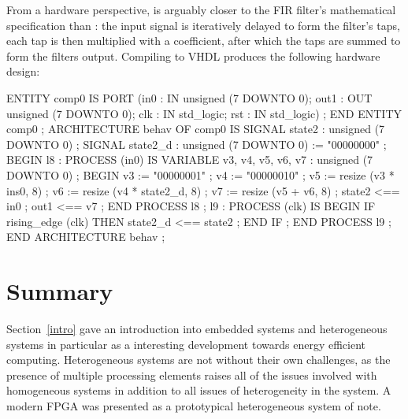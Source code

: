 \documentclass[../paper.tex]{subfiles}
\begin{document}
From a hardware perspective,  is arguably closer to the FIR filter's mathematical specification than : the input signal is iteratively delayed to form the filter's taps, each tap is then multiplied with a coefficient, after which the taps are summed to form the filters output. Compiling  to VHDL produces the following hardware design:

\begin{code}
ENTITY comp0 IS
  PORT (in0 : IN unsigned (7 DOWNTO 0);
        out1 : OUT unsigned (7 DOWNTO 0);
        clk : IN std_logic;
        rst : IN std_logic) ;
END ENTITY comp0 ;
ARCHITECTURE behav OF comp0 IS
  SIGNAL state2 : unsigned (7 DOWNTO 0) ;
  SIGNAL state2_d : unsigned (7 DOWNTO 0) := "00000000" ;
BEGIN
  l8 :
    PROCESS (in0) IS
      VARIABLE v3, v4, v5, v6, v7 : unsigned (7 DOWNTO 0) ; 
    BEGIN
      v3 := "00000001" ;
      v4 := "00000010" ;
      v5 := resize (v3 * ins0, 8) ;
      v6 := resize (v4 * state2_d, 8) ;
      v7 := resize (v5 + v6, 8) ;
      state2 <== in0 ;
      out1 <== v7 ;
    END PROCESS l8 ;
  l9 :
    PROCESS (clk) IS
    BEGIN
      IF rising_edge (clk) THEN
        state2_d <== state2 ;
      END IF ;
    END PROCESS l9 ;
END ARCHITECTURE behav ;
\end{code}

\section{Summary}

Section~\ref{intro} gave an introduction into embedded systems and heterogeneous systems in particular as a interesting development towards energy efficient computing. Heterogeneous systems are not without their own challenges, as the presence of multiple processing elements raises all of the issues involved with homogeneous systems in addition to all issues of heterogeneity in the system. A modern FPGA was presented as a prototypical heterogeneous system of note.

\end{document}
